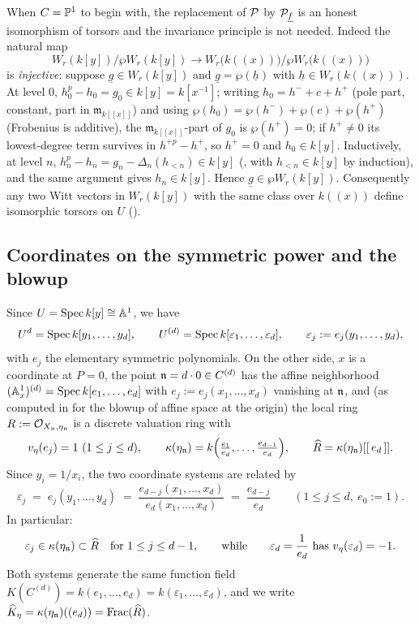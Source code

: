 \documentclass[11pt]{article}
\providecommand{\eps}{\varepsilon}                  %
\newcommand{\wv}[1]{\underline{#1}}                 %
\newcommand{\mm}{\mathfrak{m}_{k[[x]]}}             %
\begin{document}
\begin{rem*}[the case $C=\bP^1$ needs no formal-invariance principle]
When $C=\bP^1$ to begin with, the replacement of $\mathcal{P}$ by $\cP_{\wv f}$ is
an honest isomorphism of torsors and the invariance principle is not
needed.  Indeed the natural map
\[
W_r(k[y])/\wp W_r(k[y])\longrightarrow
W_r\big(k((x))\big)/\wp W_r\big(k((x))\big)
\]
is \emph{injective}: suppose $\wv g\in W_r(k[y])$ and
$\wv g=\wp(\wv h)$ with $\wv h\in W_r(k((x)))$.  At level $0$,
$h_0^p-h_0=g_0\in k[y]=k[x^{-1}]$; writing $h_0=h^-+c+h^+$
(pole part, constant, part in $\mm$) and using
$\wp(h_0)=\wp(h^-)+\wp(c)+\wp(h^+)$ (Frobenius is additive), the
$\mm$-part of $g_0$ is $\wp(h^+)=0$; if $h^+\neq0$ its lowest-degree term
survives in $h^{+p}-h^+$, so $h^+=0$ and $h_0\in k[y]$.  Inductively, at
level $n$, $h_n^p-h_n=g_n-\Delta_n(h_{<n})\in k[y]$
(, with $h_{<n}\in k[y]$ by induction), and the
same argument gives $h_n\in k[y]$.  Hence $\wv g\in\wp W_r(k[y])$.
Consequently any two Witt vectors in $W_r(k[y])$ with the same class over
$k((x))$ define isomorphic torsors on $U$ ().
\end{rem*}

\subsection{Coordinates on the symmetric power and the blowup}\label{subsec:coords}

Since $U=\operatorname{Spec} k[y]\cong\mathbb{A}^1$, we have
\[
U^{d}=\Spec k[y_1,\dots,y_d],\qquad
U^{(d)}=\Spec k[\eps_1,\dots,\eps_d],\qquad
\eps_j:=e_j(y_1,\dots,y_d),
\]
with $e_j$ the elementary symmetric polynomials.  On the other side, $x$ is
a coordinate at $P=0$, the point $\mathfrak{n}=d\cdot 0\in C^{(d)}$ has the affine
neighborhood $(\mathbb{A}^1_x)^{(d)}=\operatorname{Spec} k[e_1,\dots,e_d]$ with
$e_j:=e_j(x_1,\dots,x_d)$ vanishing at $\mathfrak{n}$, and (as computed in
 for the blowup of affine
space at the origin) the local ring
$R:=\mathcal{O}_{X_{\mathfrak{n}},\eta_{\mathfrak{n}}}$ is a discrete valuation ring with
\[
v_{\eta}(e_j)=1\ (1\le j\le d),\qquad
\kappa(\eta_{\mathfrak{n}})=k\Big(\tfrac{e_1}{e_d},\dots,\tfrac{e_{d-1}}{e_d}\Big),
\qquad
\widehat R=\kappa(\eta_{\mathfrak{n}})[[\,e_d\,]] .
\]
Since $y_i=1/x_i$, the two coordinate systems are related by
\begin{equation}\label{eq:eps-vs-e}
\eps_j\;=\;e_j(y_1,\dots,y_d)\;=\;\frac{e_{d-j}(x_1,\dots,x_d)}{e_d(x_1,\dots,x_d)}
\;=\;\frac{e_{d-j}}{e_d}
\qquad(1\le j\le d,\ e_0:=1).
\end{equation}
In particular:
\begin{equation}\label{eq:eps-in-kappa}
\eps_j\in\kappa(\eta_\ndls)\subset\widehat R
\quad\text{for }1\le j\le d-1,
\qquad\text{while}\qquad
\eps_d=\frac{1}{e_d}\ \text{has}\ v_\eta(\eps_d)=-1 .
\end{equation}
Both systems generate the same function field
$K(C^{(d)})=k(e_1,\dots,e_d)=k(\eps_1,\dots,\eps_d)$, and we write
$\widehat K_\eta=\kappa(\eta_{\mathfrak{n}})((e_d))=\operatorname{Frac}(\widehat R)$.
\end{document}
